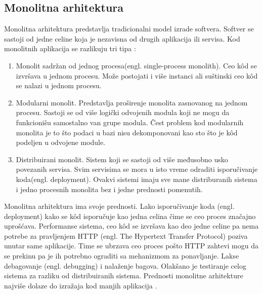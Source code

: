 \documentclass[12pt,oneside]{memoir}
\begin{document}
\subsection{Monolitna arhitektura}
Monolitna arhitektura predstavlja tradicionalni model izrade softvera. Softver se sastoji od jedne celine koja je nezavisna od drugih aplikacija ili servisa. Kod monolitnih aplikacija se razlikuju tri tipa \cite{bm}:
\begin{enumerate}
  \item Monolit sadržan od jednog procesa(engl. single-process monolith). Ceo kôd se izvršava u jednom procesu. Može postojati i više instanci ali suštinski ceo kôd se nalazi u jednom procesu. 
  \item Modularni monolit. Predstavlja proširenje monolita zasnovanog na jednom procesu. Sastoji se od više logički odvojenih modula koji ne mogu da funkcionišu samostalno van grupe modula. Čest problem kod modularnih monolita je to što podaci u bazi nisu dekomponovani kao sto što je kôd podeljen u odvojene module.
  \item Distribuirani monolit. Sistem koji se sastoji od više međusobno usko povezanih servisa. Svim servisima se mora u isto vreme odraditi isporučivanje koda(engl. deployment). Ovakvi sistemi imaju sve mane distriburanih sistema i jedno procesnih monolita bez i jedne prednosti pomenutih.
\end{enumerate}
 
Monolitna arhitektura ima svoje prednosti. Lako isporučivanje koda (engl. deployment) kako se kôd isporučuje kao jedna celina čime se ceo proces značajno uprošćava. Performanse sistema, ceo kôd se izvršava kao deo jedne celine pa nema potrebe za pravljenjem HTTP (engl. The Hypertext Transfer Protocol) poziva unutar same aplikacije. Time se ubrzava ceo proces pošto HTTP zahtevi mogu da se prekinu pa je ih potrebno ograditi sa mehanizmom za ponavljanje. Lakse debagovanje (engl. debugging) i nalaženje bagova. Olakšano je testiranje celog sistema za razliku od distribuiranih sistema. Prednosti monolitne arhitekture najviše dolaze do izražaja kod manjih aplikacija \cite{bm}.
 
\end{document}
